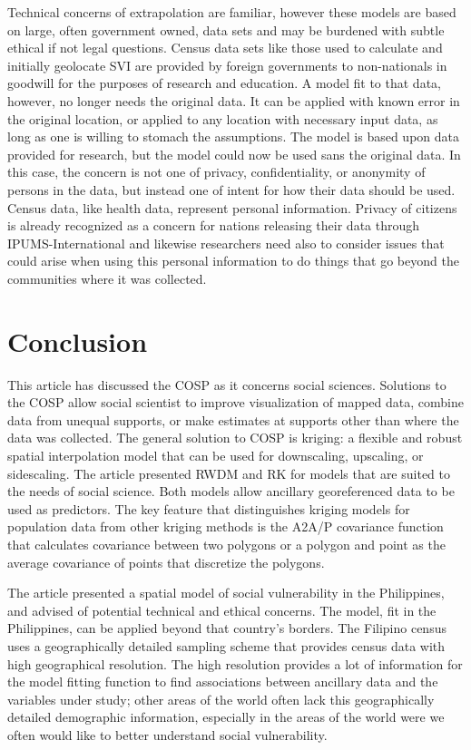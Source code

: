 Technical concerns of extrapolation are familiar, however these models are based on large, often government owned, data sets and may be burdened with subtle ethical if not legal questions.  Census data sets like those used to calculate and initially geolocate SVI are provided by foreign governments to non-nationals in goodwill for the purposes of research and education.  A model fit to that data, however, no longer needs the original data.  It can be applied with known error in the original location, or applied to any location with necessary input data, as long as one is willing to stomach the assumptions.  The model is based upon data provided for research, but the model could now be used sans the original data.  In this case, the concern is not one of privacy, confidentiality, or anonymity of persons in the data, but instead one of intent for how their data should be used.  Census data, like health data, represent personal information.  Privacy of citizens is already recognized as a concern for nations releasing their data through IPUMS-International \citep{mccaa06} and likewise researchers need also to consider issues that could arise when using this personal information to do things that go beyond the communities where it was collected.


\section{Conclusion}

This article has discussed the COSP as it concerns social sciences.  Solutions to the COSP allow social scientist to improve visualization of mapped data, combine data from unequal supports, or make estimates at supports other than where the data was collected.  The general solution to COSP is kriging: a flexible and robust spatial interpolation model that can be used for downscaling, upscaling, or sidescaling.  The article presented RWDM and RK for models that are suited to the needs of social science.  Both models allow ancillary georeferenced data to be used as predictors.  The key feature that distinguishes kriging models for population data from other kriging methods is the A2A/P covariance function that calculates covariance between two polygons or a polygon and point as the average covariance of points that discretize the polygons.

The article presented a spatial model of social vulnerability in the Philippines, and advised of potential technical and ethical concerns.  The model, fit in the Philippines, can be applied beyond that country's borders.  The Filipino census uses a geographically detailed sampling scheme that provides census data with high geographical resolution.  The high resolution provides a lot of information for the model fitting function to find associations between ancillary data and the variables under study; other areas of the world often lack this geographically detailed demographic information, especially in the areas of the world were we often would like to better understand social vulnerability.

